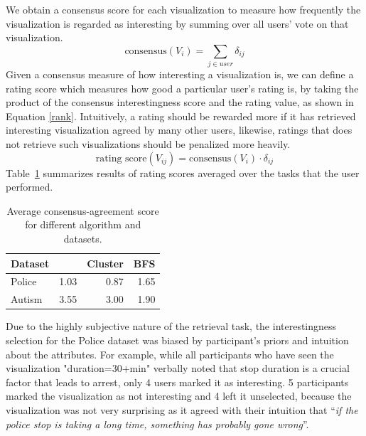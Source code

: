 We obtain a consensus score for each visualization to measure how frequently the visualization is regarded as interesting by summing over all users' vote on that visualization.
\begin{equation}\label{vote}
\textrm{consensus}(V_i) =\sum_{j\in user} \delta_{ij}
\end{equation}
Given a consensus measure of how interesting a visualization is, we can define a rating score which measures how good a particular user's rating is, by taking the product of the consensus interestingness score and the rating value, as shown in Equation \ref{rank}. Intuitively, a rating should be rewarded more if it has retrieved interesting visualization agreed by many other users, likewise, ratings that does not retrieve such visualizations should be penalized more heavily.
\begin{equation}\label{rank}
\textrm{rating score}(V_{ij}) =\textrm{consensus}(V_i) \cdot \delta_{ij}
\end{equation}
Table~\ref{table:interestingScore} summarizes results of rating scores averaged over the tasks that the user performed.
\begin{table}[ht!]
	\centering
	\begin{tabular}{lrrr}
		\hline
		 Dataset   &   \system &   Cluster &   BFS \\
		\hline
		 Police    &      1.03 &      0.87 &  1.65 \\
		 Autism    &      3.55 &      3.00 &  1.90 \\
		\hline
	\end{tabular}
	\caption{Average consensus-agreement score for different algorithm and datasets.}%
	\label{table:interestingScore}
	\vspace{-20pt}
\end{table}
\npar Due to the highly subjective nature of the retrieval task, the interestingness selection for the Police dataset was biased by participant's priors and intuition about the attributes. For example, while all participants who have seen the visualization "duration=30+min" verbally noted that stop duration is a crucial factor that leads to arrest, only 4 users marked it as interesting. 5 participants marked the visualization as not interesting and 4 left it unselected, because the visualization was not very surprising as it agreed with their intuition that ``\textit{if the police stop is taking a long time, something has probably gone wrong}''.
